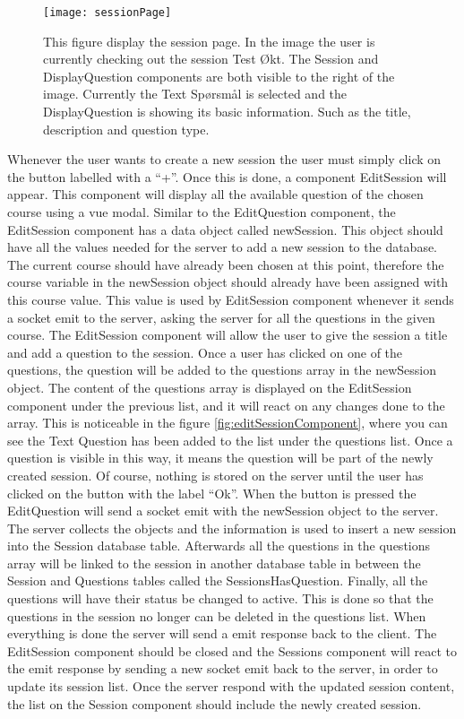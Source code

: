 \begin{figure}[H]
	\texttt{[image: sessionPage]}
	\caption{This figure display the session page. In the image the user is currently checking out the session Test Økt. The Session and DisplayQuestion components are both visible to the right of the image. Currently the Text Spørsmål is selected and the DisplayQuestion is showing its basic information. Such as the title, description and question type.}
	\label{fig:sessionPage}
\end{figure}
Whenever the user wants to create a new session the user must simply click on the button labelled with a “+”. Once this is done, a component EditSession will appear. This component will display all the available question of the chosen course using a vue modal. Similar to the EditQuestion component, the EditSession component has a data object called newSession. This object should have all the values needed for the server to add a new session to the database. The current course should have already been chosen at this point, therefore the course variable in the newSession object should already have been assigned with this course value. This value is used by EditSession component whenever it sends a socket emit to the server, asking the server for all the questions in the given course. The EditSession component will allow the user to give the session a title and add a question to the session. Once a user has clicked on one of the questions, the question will be added to the questions array in the newSession object. The content of the questions array is displayed on the EditSession component under the previous list, and it will react on any changes done to the array. This is noticeable in the figure \ref{fig:editSessionComponent}, where you can see the Text Question has been added to the list under the questions list. Once a question is visible in this way, it means the question will be part of the newly created session. Of course, nothing is stored on the server until the user has clicked on the button with the label “Ok”. When the button is pressed the EditQuestion will send a socket emit with the newSession object to the server. The server collects the objects and the information is used to insert a new session into the Session database table. Afterwards all the questions in the questions array will be linked to the session in another database table in between the Session and Questions tables called the SessionsHasQuestion. Finally, all the questions will have their status be changed to active. This is done so that the questions in the session no longer can be deleted in the questions list. When everything is done the server will send a emit response back to the client. The EditSession component should be closed and the Sessions component will react to the emit response by sending a new socket emit back to the server, in order to update its session list. Once the server respond with the updated session content, the list on the Session component should include the newly created session.  
